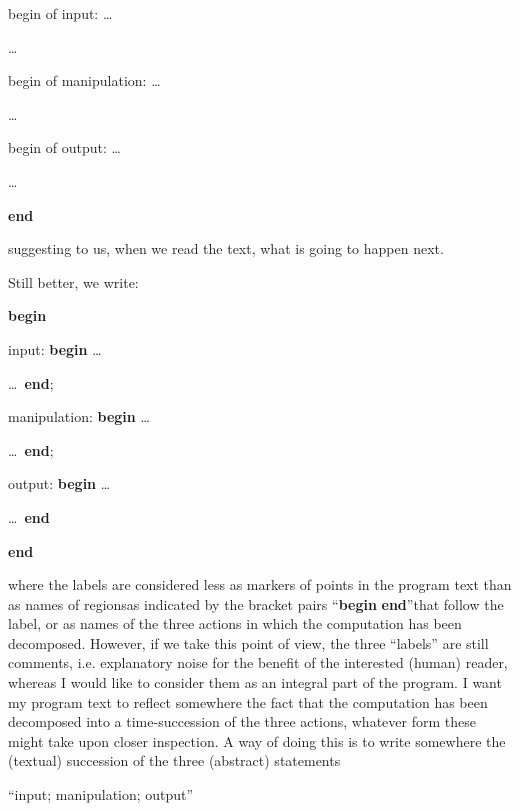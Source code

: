 \noindent
begin of input:\tabto{10em} \quad\dots
\nopagebreak

\noindent
\tabto{10em} \quad\dots

\noindent
begin of manipulation:\tabto{10em} \quad\dots
\nopagebreak

\noindent
\tabto{10em} \quad\dots

\noindent
begin of output:\tabto{10em} \quad\dots
\nopagebreak

\noindent
\tabto{10em} \quad\dots

\noindent
\tabto{10em}\textbf{end}

\noindent
suggesting to us, when we read the text, what is going to happen next.

Still better, we write:

\noindent
\tabto{10em}\textbf{begin}
\nopagebreak

\noindent
input:\tabto{10em} \quad\textbf{begin} \tabto{14em}\dots
\nopagebreak

\noindent
\tabto{13em} \quad\dots\ \textbf{end};

\noindent
manipulation:\tabto{10em} \quad\textbf{begin} \tabto{14em}\dots
\nopagebreak

\noindent
\tabto{13em} \quad\dots\ \textbf{end};

\noindent
output:\tabto{10em} \quad\textbf{begin} \tabto{14em}\dots
\nopagebreak
\nopagebreak

\noindent
\tabto{13em} \quad\dots\ \textbf{end}
\nopagebreak

\noindent
\tabto{10em}\textbf{end}

\noindent
where the labels are considered less as markers of points in the program text than as names of regions\textemdash{}as indicated by the bracket pairs ``\textbf{begin} \textendash  \textbf{end}''\textemdash{}that follow the label, or as names of the three actions in which the computation has been decomposed. However, if we take this point of view, the three ``labels'' are still comments, i.e. explanatory noise for the benefit of the interested (human) reader, whereas I would like to consider them as an integral part of the program. I want my program text to reflect somewhere the fact that the computation has been decomposed into a time-succession of the three actions, whatever form these might take upon closer inspection. A way of doing this is to write somewhere the (textual) succession of the three (abstract) statements
\medskip

{
	\setlength{\parindent}{8em}
	\hspace{-.4em}``input; manipulation; output''
}
\medskip

